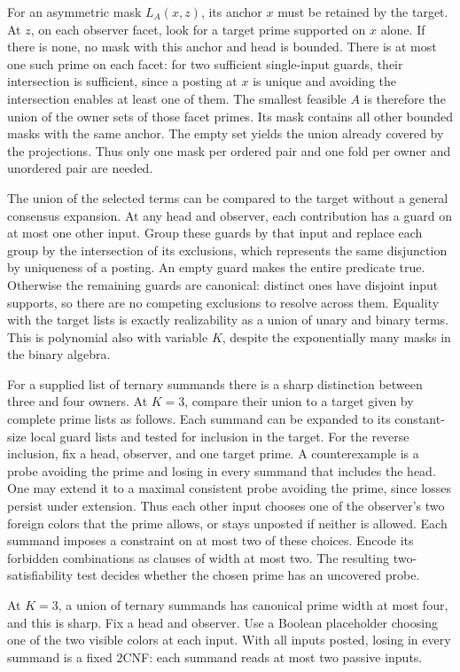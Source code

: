 For an asymmetric mask $L_A(x,z)$, its anchor $x$ must be
retained by the target. At $z$, on each observer facet, look
for a target prime supported on $x$ alone. If there is none,
no mask with this anchor and head is bounded. There is at
most one such prime on each facet: for two sufficient
single-input guards, their intersection is sufficient, since
a posting at $x$ is unique and avoiding the intersection
enables at least one of them. The smallest feasible $A$ is
therefore the union of the owner sets of those facet primes.
Its mask contains all other bounded masks with the same
anchor. The empty set yields the union already covered by
the projections. Thus only one mask per ordered pair and
one fold per owner and unordered pair are needed.

The union of the selected terms can be compared to the
target without a general consensus expansion. At any head
and observer, each contribution has a guard on at most one
other input. Group these guards by that input and replace
each group by the intersection of its exclusions, which
represents the same disjunction by uniqueness of a posting.
An empty guard makes the entire predicate true. Otherwise
the remaining guards are canonical: distinct ones have
disjoint input supports, so there are no competing exclusions
to resolve across them. Equality with the target lists is
exactly realizability as a union of unary and binary terms.
This is polynomial also with variable $K$, despite the
exponentially many masks in the binary algebra.

For a supplied list of ternary summands there is a sharp
distinction between three and four owners. At $K=3$, compare
their union to a target given by complete prime lists as
follows. Each summand can be expanded to its constant-size
local guard lists and tested for inclusion in the target.
For the reverse inclusion, fix a head, observer, and one
target prime. A counterexample is a probe avoiding the prime
and losing in every summand that includes the head. One may
extend it to a maximal consistent probe avoiding the prime,
since losses persist under extension. Thus each other input
chooses one of the observer's two foreign colors that the
prime allows, or stays unposted if neither is allowed.
Each summand imposes a constraint on at most two of these
choices. Encode its forbidden combinations as clauses of
width at most two. The resulting two-satisfiability test
decides whether the chosen prime has an uncovered probe.

At $K=3$, a union of ternary summands has
canonical prime width at most four, and this
is sharp. Fix a head and observer. Use a Boolean
placeholder choosing one of the two visible
colors at each input. With all inputs posted,
losing in every summand is a fixed $2$CNF:
each summand reads at most two passive inputs.


